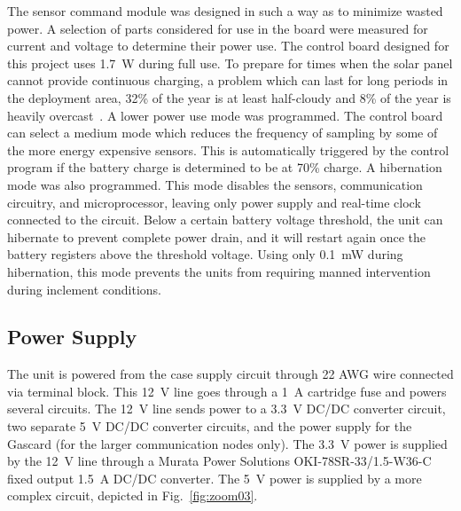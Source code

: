 \documentclass[numbook, envcountsect, envcountsame, envcountreset, runningheads, twocolumn]{svjour3}
\begin{document}
		The sensor command module was designed in such a way as to minimize wasted power.  A selection of parts considered for use in the board were measured for current and voltage to determine their power use.  The control board designed for this project uses \SI{1.7}{\watt} during full use.  To prepare for times when the solar panel cannot provide continuous charging, a problem which can last for long periods in the deployment area, 32\% of the year is at least half-cloudy and 8\% of the year is heavily overcast~\cite{kswo_weather_2015}. A lower power use mode was programmed.  The control board can select a medium mode which reduces the frequency of sampling by some of the more energy expensive sensors.  This is automatically triggered by the control program if the battery charge is determined to be at 70\% charge.  A hibernation mode was also programmed.  This mode disables the sensors, communication circuitry, and microprocessor, leaving only power supply and real-time clock connected to the circuit.  Below a certain battery voltage threshold, the unit can hibernate to prevent complete power drain, and it will restart again once the battery registers above the threshold voltage.  Using only \SI{0.1}{\milli\watt} during hibernation, this mode prevents the units from requiring manned intervention during inclement conditions.
		
		\subsection{Power Supply}
			The unit is powered from the case supply circuit through 22 AWG wire connected via terminal block.  This \SI{12}{\volt} line goes through a \SI{1}{\ampere} cartridge fuse and powers several circuits.  The \SI{12}{\volt} line sends power to a \SI{3.3}{\volt} DC/DC converter circuit, two separate \SI{5}{\volt} DC/DC converter circuits, and the power supply for the Gascard (for the larger communication nodes only).  The \SI{3.3}{\volt} power is supplied by the \SI{12}{\volt} line through a Murata Power Solutions OKI-78SR-33/1.5-W36-C fixed output \SI{1.5}{\ampere} DC/DC converter.  The \SI{5}{\volt} power is supplied by a more complex circuit, depicted in Fig.~\ref{fig:zoom03}.
			
\end{document}
